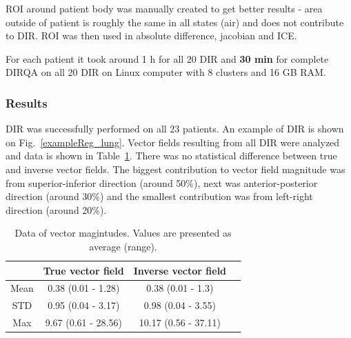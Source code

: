 \documentclass[type=dr, dr=rernat, accentcolor=tud7b,colorbacktitle, bigchapter, openright, twoside, 12pt ]{tudthesis}
\begin{document}
ROI around patient body was manually created to get better results - area outside of patient is roughly the same in all states (air) and does not contribute to DIR. ROI was then used in absolute difference, jacobian and ICE.

For each patient it took around 1 h for all 20 DIR and \textbf{30 min} for complete DIRQA on all 20 DIR  on Linux computer with 8 clusters and 16 GB RAM.


\subsubsection{Results}

DIR was successfully performed on all 23 patients. An example of DIR is shown on Fig.~\ref{exampleReg_lung}. Vector fields resulting from all DIR were analyzed and data is shown in Table~\ref{tab:vectordata_lung}. There was no statistical
difference between true and inverse vector fields. The biggest contribution to vector field magnitude was from superior-inferior direction (around 50\%), next was anterior-posterior direction (around 30\%) and the smallest contribution was from left-right direction (around 20\%).

\begin{table}[H]
  \centering
  \caption{Data of vector magintudes. Values are presented as average (range).}
  \begin{tabular}{c|c|c|c}
  
       & True vector field & Inverse vector field  \\
       \hline
       Mean & 0.38 (0.01 - 1.28) & 0.38 (0.01 - 1.3) \\ 
       STD & 0.95 (0.04 - 3.17) & 0.98 (0.04 - 3.55) \\ 
       Max & 9.67 (0.61 - 28.56) & 10.17 (0.56 - 37.11) \\
    \hline\hline
  \end{tabular}
  \label{tab:vectordata_lung}
\end{table}
\end{document}
